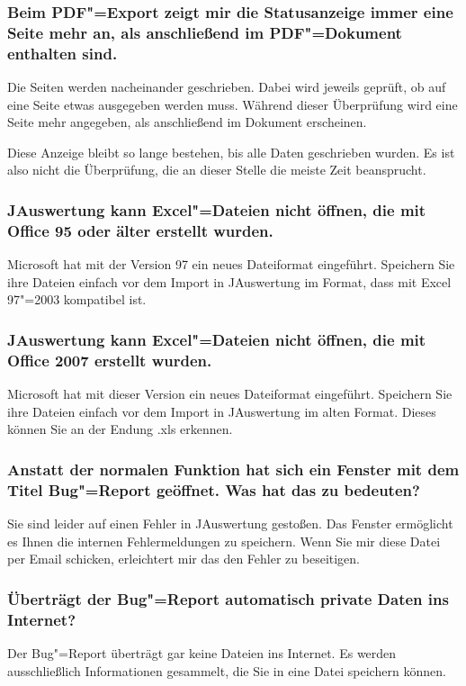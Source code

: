 \documentclass[11pt,a4paper,twoside,ngerman]{article}
\begin{document}
\subsubsection*{Beim PDF"=Export zeigt mir die Statusanzeige immer eine Seite mehr an, als anschließend im PDF"=Dokument enthalten sind.}
Die Seiten werden nacheinander geschrieben. Dabei wird jeweils geprüft, ob auf eine Seite etwas ausgegeben werden muss. Während dieser Überprüfung wird eine Seite mehr angegeben, als anschließend im Dokument erscheinen.

Diese Anzeige bleibt so lange bestehen, bis alle Daten geschrieben wurden. Es ist also nicht die Überprüfung, die an dieser Stelle die meiste Zeit beansprucht.


\subsubsection*{JAuswertung kann Excel"=Dateien nicht öffnen, die mit Office 95 oder älter erstellt wurden.}
Microsoft hat mit der Version 97 ein neues Dateiformat eingeführt. Speichern Sie ihre Dateien einfach vor dem Import in JAuswertung im Format, dass mit Excel 97"=2003 kompatibel ist.


\subsubsection*{JAuswertung kann Excel"=Dateien nicht öffnen, die mit Office 2007 erstellt wurden.}
Microsoft hat mit dieser Version ein neues Dateiformat eingeführt. Speichern Sie ihre Dateien einfach vor dem Import in JAuswertung im alten Format. Dieses können Sie an der Endung \glqq{}.xls\grqq{} erkennen.


\subsubsection*{Anstatt der normalen Funktion hat sich ein Fenster mit dem Titel \glqq{}Bug"=Report\grqq{} geöffnet. Was hat das zu bedeuten?}
Sie sind leider auf einen Fehler in JAuswertung gestoßen. Das Fenster ermöglicht es Ihnen die internen Fehlermeldungen zu speichern. Wenn Sie mir diese Datei per Email schicken, erleichtert mir das den Fehler zu beseitigen.


\subsubsection*{Überträgt der \glqq{}Bug"=Report\grqq{} automatisch private Daten ins Internet?}
Der \glqq{}Bug"=Report\grqq{} überträgt gar keine Dateien ins Internet. Es werden ausschließlich Informationen gesammelt, die Sie in eine Datei speichern können.
\end{document}
